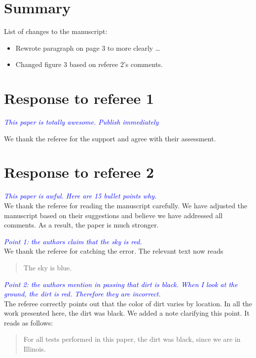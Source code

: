 \documentclass{article}
\newcommand{\referee}[1]{\textcolor{blue}{\textit{#1 \\}}}
\begin{document}
\section*{Summary} 

List of changes to the manuscript:
\begin{itemize}
    \item Rewrote paragraph on page 3 to more clearly \ldots
    \item Changed figure 3 based on referee 2's comments.
\end{itemize}

\section*{Response to referee 1}

\referee{This paper is totally awesome. Publish immediately}

We thank the referee for the support and agree with their assessment.


\section*{Response to referee 2} 

\referee{This paper is awful. Here are 15 bullet points why.}
We thank the referee for reading the manuscript carefully. 
We have adjusted the manuscript based on their suggestions and believe we have addressed all comments. 
As a result, the paper is much stronger.

\referee{Point 1: the authors claim that the sky is red.}
We thank the referee for catching the error. The relevant text now reads 
\begin{quotation}
    The sky is blue.
\end{quotation}

\referee{Point 2: the authors mention in passing that dirt is black. When I look at the ground, the dirt is red. Therefore they are incorrect.}
The referee correctly points out that the color of dirt varies by location. In all the work presented here, the dirt was black. We added a note clarifying this point. 
It reads as follows:
\begin{quotation}
    For all tests performed in this paper, the dirt was black, since we are in Illinois.
\end{quotation}
\end{document}
